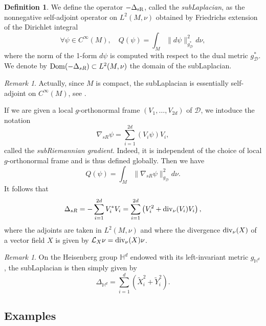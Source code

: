 \documentclass[12pt,a4paper]{amsart}
\theoremstyle{plain}
\theoremstyle{definition}
\newtheorem{definition}[theorem]{Definition}
\theoremstyle{remark}
\newtheorem{remark}[theorem]{Remark}
\numberwithin{equation}{section}
\theoremstyle{definition}
\def \div{{\rm div}}
\def \cD{\mathcal{D}}
\def \Heis{\mathbb{H}}
\numberwithin{equation}{section}
\begin{document}
\begin{definition}
 \label{def:subLaplacian}
 We define the operator $-\Delta_{\rm sR}$, called the \emph{subLaplacian}, as the nonnegative self-adjoint operator on $L^2(M,\nu)$
 obtained by Friedrichs extension of the Dirichlet integral 
 \begin{equation*}
 \forall \psi \in C^\infty(M),\quad Q(\psi) = \int_M \|d\psi\|_{g_{\cD}^*}^2 d\nu,
 \end{equation*}
 where the norm of the 1-form $d\psi$ is computed with respect to the dual metric $g_{\cD}^*$. We denote by ${\rm Dom}(-\Delta_{sR})\subset L^2(M,\nu)$ the domain of the subLaplacian.
\end{definition}

\begin{remark}
    Actually, since $M$ is compact, the subLaplacian is essentially self-adjoint on $C^\infty(M)$, see \cite{Str}.
\end{remark}

If we are given a local $g$-orthonormal frame $(V_1,\dots,V_{2d})$ of $\cD$, we intoduce the notation 
\begin{equation*}
 \nabla_{sR} \psi = \sum_{i=1}^{2d} (V_i \psi)V_i,
\end{equation*}
called the \emph{subRiemannian gradient}. Indeed, it is independent of the choice of local $g$-orthonormal frame and is thus defined globally. Then we have 
\begin{equation*}
 Q(\psi) = \int_M \|\nabla_{sR} \psi\|_{g_\cD}^2 d\nu.
\end{equation*}
It follows that 
\begin{equation*}
 \Delta_{sR} = - \sum_{i=1}^{2d} V_{i}^* V_i = \sum_{i=1}^{2d} \left(V_{i}^2 + \div_\nu(V_i) V_i\right),
\end{equation*}
where the adjoints are taken in $L^2(M,\nu)$ and where the divergence $\div_\nu(X)$ of a vector field $X$ is given by 
$\mathcal{L}_X \nu = \div_\nu(X)\nu$.

\begin{remark}
    On the Heisenberg group $\Heis^d$ endowed with its left-invariant metric $g_{\Heis^d}$, the subLaplacian is then simply given by
    \begin{equation*}
        \Delta_{\Heis^d} = \sum_{i=1}^d (\tilde{X}_i^2+\tilde{Y}_i^2).
    \end{equation*}
\end{remark}

\subsection{Examples}
\end{document}
